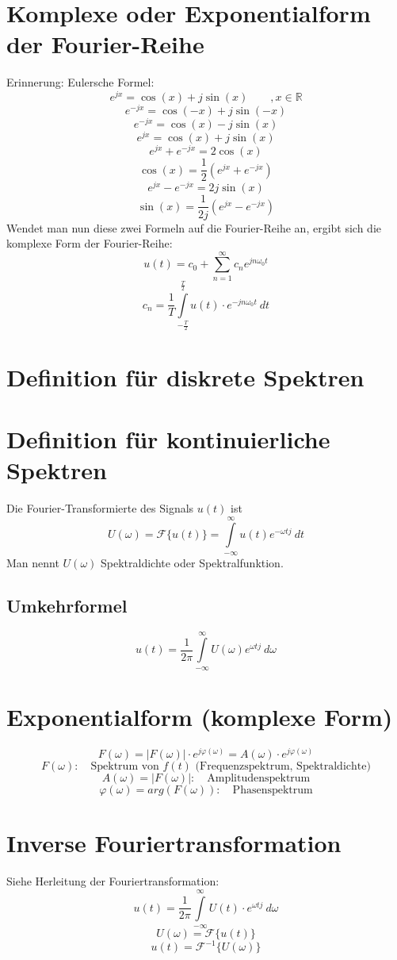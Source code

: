 \section{Komplexe oder Exponentialform der Fourier-Reihe}
Erinnerung: Eulersche Formel: 
\[ e^{j x} = \cos(x) + j \sin(x) \qquad , x \in \mathbb{R} \]
\[ e^{- j x} = \cos(-x) + j \sin(-x) \]
\[ e^{- j x} = \cos(x) - j \sin(x) \]
\[ e^{j x} = \cos(x) + j \sin(x) \]
\[ e^{jx} + e^{-jx} = 2 \cos(x) \]
\[ \boxed{\cos(x) = \frac{1}{2} (e^{jx} + e^{-jx})} \]
\[ e^{jx} - e^{-jx} = 2 j \sin(x) \]
\[ \boxed{\sin(x) = \frac{1}{2j} (e^{jx} - e^{-jx})} \]
Wendet man nun diese zwei Formeln auf die Fourier-Reihe an, ergibt sich die komplexe Form der Fourier-Reihe:
\[ u(t) = c_0 + \sum\limits_{n = 1}^{\infty} c_n e^{j n \omega_0 t} \]
\[ c_n = \frac{1}{T} \int\limits_{-\frac{T}{2}}^{\frac{T}{2}} 
u(t) \cdot e^{-j n \omega_0 t} ~ dt \]


\section{Definition für diskrete Spektren}


\section{Definition für kontinuierliche Spektren}
 Die Fourier-Transformierte des Signals $u(t)$ ist 
\[ \boxed{U(\omega) = \mathcal{F}\{ u(t) \} = \int\limits_{-\infty}^{\infty} 
u(t) e^{-\omega t j} ~dt } \]
Man nennt $U(\omega)$ Spektraldichte oder Spektralfunktion. 

\subsection{Umkehrformel}
\[ \boxed{u(t) = \frac{1}{2 \pi} \int\limits_{-\infty}^{\infty} 
U(\omega) e^{\omega t j} ~ d\omega} \]

\section{Exponentialform (komplexe Form)}
\[ \boxed{F(\omega) = |F(\omega)| \cdot e^{j\varphi(\omega)} = A(\omega) \cdot e^{j\varphi(\omega)}}   \]
\[ F(\omega): \quad \text{Spektrum von $f(t)$ (Frequenzspektrum, Spektraldichte)} \]
\[ A(\omega) = |F(\omega)|: \quad \text{Amplitudenspektrum} \]
\[ \varphi (\omega) = arg(F(\omega)): \quad \text{Phasenspektrum} \]

\section{Inverse Fouriertransformation}
Siehe Herleitung der Fouriertransformation: 
\[ u(t) = \frac{1}{2 \pi}  \int\limits_{-\infty}^{\infty} U(t) \cdot e^{\omega t j} ~ d\omega \]
\[ U(\omega) = \mathcal{F} \{ u(t) \} \]
\[ u(t) = \mathcal{F}^{-1} \{ U(\omega) \} \]

